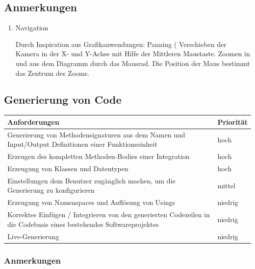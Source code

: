 \subsection{Anmerkungen}

\begin{enumerate}
\item Navigation

Durch Inspiration aus Grafikanwendungen: Panning ( Verschieben der Kamera in
der X- und Y-Achse mit Hilfe der Mittleren Maustaste. Zoomen in und aus dem
Diagramm durch das Mausrad. Die Position der Maus bestimmt das Zentrum des
Zooms.
\end{enumerate}




\subsection{Generierung von Code}


\begin{tabularx}{\textwidth}{X|l}
Anforderungen & Priorität\\
\hline
Generierung von Methodensignaturen aus dem Namen und Input/Output Definitionen einer Funktionseinheit & hoch\\
\hline
Erzeugen des kompletten Methoden-Bodies einer Integration & hoch\\
\hline
Erzeugung von Klassen und Datentypen & hoch\\
\hline
Einstellungen  dem Benutzer zugänglich machen, um die Generierung zu konfigurieren & mittel\\
\hline
Erzeugung von Namenspaces und Auflösung von Usings & niedrig\\
\hline
Korrektes Einfügen / Integrieren von den generierten Codezeilen in die Codebasis eines bestehendes Softwareprojektes & niedrig\\
\hline
Live-Generierung & niedrig\\
\hline
\end{tabularx}


\subsubsection{Anmerkungen}

